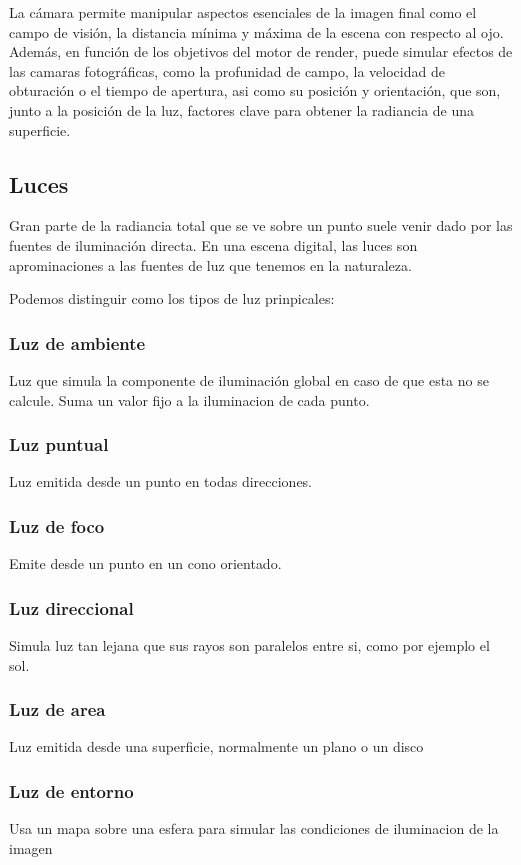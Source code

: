     La c\'amara permite manipular aspectos esenciales de la imagen final como el campo de visi\'on, la distancia m\'inima y m\'axima de la escena
    con respecto al ojo. Adem\'as, en funci\'on de los objetivos del motor de render, puede simular efectos de las camaras fotogr\'aficas, como la
    profunidad de campo, la velocidad de obturaci\'on o el tiempo de apertura, asi como su posici\'on y orientaci\'on, que son, junto a la posici\'on
    de la luz, factores clave para obtener la radiancia de una superficie.

    \subsection{Luces}
        Gran parte de la radiancia total que se ve sobre un punto suele venir dado por las fuentes de iluminaci\'on directa. En una escena digital,
        las luces son aprominaciones a las fuentes de luz que tenemos en la naturaleza.
        
        Podemos distinguir como los tipos de luz prinpicales:

        \subsubsection{Luz de ambiente}
            Luz que simula la componente de iluminaci\'on global en caso de que esta no se calcule. Suma un valor fijo a la iluminacion de cada punto.
        \subsubsection{Luz puntual}
            Luz emitida desde un punto en todas direcciones.
        \subsubsection{Luz de foco}
            Emite desde un punto en un cono orientado.
        \subsubsection{Luz direccional}
            Simula luz tan lejana que sus rayos son paralelos entre si, como por ejemplo el sol.
        \subsubsection{Luz de area}
            Luz emitida desde una superficie, normalmente un plano o un disco
        \subsubsection{Luz de entorno}
            Usa un mapa sobre una esfera para simular las condiciones de iluminacion de la imagen

